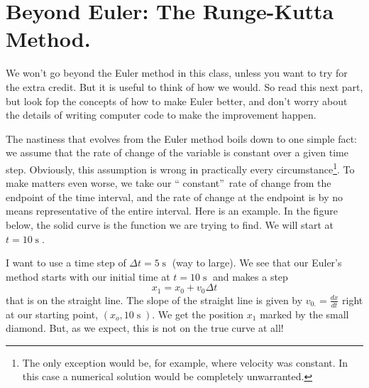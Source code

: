 \documentclass{book}
\begin{document}
\section{Beyond Euler: The Runge-Kutta Method.}

We won't go beyond the Euler method in this class, unless you want to try for
the extra credit. But it is useful to think of how we would. So read this next
part, but look fop the concepts of how to make Euler better, and don't worry
about the details of writing computer code to make the improvement happen.

The nastiness that evolves from the Euler method boils down to one simple
fact: we assume that the rate of change of the variable is constant over a
given time step. Obviously, this assumption is wrong in practically every
circumstance\footnote{The only exception would be, for example, where velocity
was constant. In this case a numerical solution would be completely
unwarranted.}. To make matters even worse, we take our \textquotedblleft
constant\textquotedblright\ rate of change from the endpoint of the time
interval, and the rate of change at the endpoint is by no means representative
of the entire interval. Here is an example. In the figure below, the solid
curve is the function we are trying to find. We will start at $t=10 \operatorname{s} .$ \begin{center}
\end{center}
I want to use a time step of $\Delta t=5 \operatorname{s} $ (way to large). We see that our Euler's method starts with our initial time
at $t=10 \operatorname{s} $ and makes a step
\[
x_{1}=x_{0}+v_{0}\Delta t
\]
that is on the straight line. The slope of the straight line is given by
$v_{0.}=\frac{dx}{dt}$ right at our starting point, $(x_{o},10 \operatorname{s} ).$ We get the position $x_{1}$ marked by the small diamond. But, as we
expect, this is not on the true curve at all!
\end{document}
